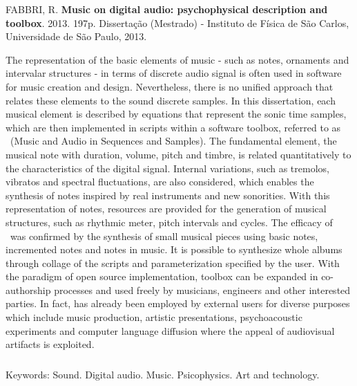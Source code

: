 \begin{abstract2}
\vspace{-10mm}
FABBRI, R. \textbf{Music on digital audio: psychophysical description and toolbox}. 2013. 197p. Dissertação (Mestrado) - Instituto de Física de São Carlos, Universidade de São Paulo, 2013.
\vspace{15mm}

The representation of the basic elements of music - such as notes, ornaments and intervalar structures - in terms of discrete audio signal is often used in software for music creation and design. Nevertheless, there is no unified approach that relates these elements to the sound discrete samples. In this dissertation, each musical element is described by equations that represent the sonic time samples, which are then implemented in scripts within a software toolbox, referred to as \massa\ (Music and Audio in Sequences and Samples). The fundamental element, the musical note with duration, volume, pitch and timbre, is related quantitatively to the characteristics of the digital signal. Internal variations, such as tremolos, vibratos and spectral fluctuations, are also considered, which enables the synthesis of notes inspired by real instruments and new sonorities. With this representation of notes, resources are provided for the generation of musical structures, such as rhythmic meter, pitch intervals and cycles. The efficacy of \massa\ was confirmed by the synthesis of small musical pieces using basic notes, incremented notes and notes in music. It is possible to synthesize whole albums through collage of the scripts and parameterization specified by the user. With the paradigm of open source implementation, \massa toolbox can be expanded in co-authorship processes and used freely by musicians, engineers and other interested parties. In fact, \massa has already been employed by external users for diverse purposes which include music production, artistic presentations, psychoacoustic experiments and computer language diffusion where the appeal of audiovisual artifacts is exploited.


$\phantom{linha em branco}$\\
Keywords: Sound. Digital audio. Music. Psicophysics. Art and technology.


\end{abstract2}
